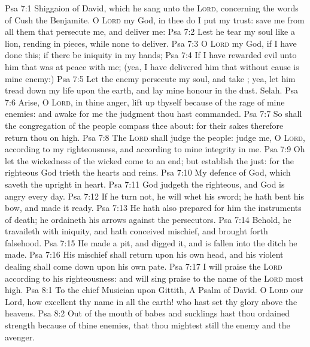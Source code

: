 \vs Psa 7:1 Shiggaion of David, which he sang unto the \textsc{Lord}, concerning the words of Cush the Benjamite. O \textsc{Lord} my God, in thee do I put my trust: save me from all them that persecute me, and deliver me:
\vs Psa 7:2 Lest he tear my soul like a lion, rending  in pieces, while  none to deliver.
\vs Psa 7:3 O \textsc{Lord} my God, if I have done this; if there be iniquity in my hands;
\vs Psa 7:4 If I have rewarded evil unto him that was at peace with me; (yea, I have delivered him that without cause is mine enemy:)
\vs Psa 7:5 Let the enemy persecute my soul, and take ; yea, let him tread down my life upon the earth, and lay mine honour in the dust. Selah.
\vs Psa 7:6 Arise, O \textsc{Lord}, in thine anger, lift up thyself because of the rage of mine enemies: and awake for me  the judgment  thou hast commanded.
\vs Psa 7:7 So shall the congregation of the people compass thee about: for their sakes therefore return thou on high.
\vs Psa 7:8 The \textsc{Lord} shall judge the people: judge me, O \textsc{Lord}, according to my righteousness, and according to mine integrity  in me.
\vs Psa 7:9 Oh let the wickedness of the wicked come to an end; but establish the just: for the righteous God trieth the hearts and reins.
\vs Psa 7:10 My defence  of God, which saveth the upright in heart.
\vs Psa 7:11 God judgeth the righteous, and God is angry  every day.
\vs Psa 7:12 If he turn not, he will whet his sword; he hath bent his bow, and made it ready.
\vs Psa 7:13 He hath also prepared for him the instruments of death; he ordaineth his arrows against the persecutors.
\vs Psa 7:14 Behold, he travaileth with iniquity, and hath conceived mischief, and brought forth falsehood.
\vs Psa 7:15 He made a pit, and digged it, and is fallen into the ditch  he made.
\vs Psa 7:16 His mischief shall return upon his own head, and his violent dealing shall come down upon his own pate.
\vs Psa 7:17 I will praise the \textsc{Lord} according to his righteousness: and will sing praise to the name of the \textsc{Lord} most high.
\vs Psa 8:1 To the chief Musician upon Gittith, A Psalm of David. O \textsc{Lord} our Lord, how excellent  thy name in all the earth! who hast set thy glory above the heavens.
\vs Psa 8:2 Out of the mouth of babes and sucklings hast thou ordained strength because of thine enemies, that thou mightest still the enemy and the avenger.
